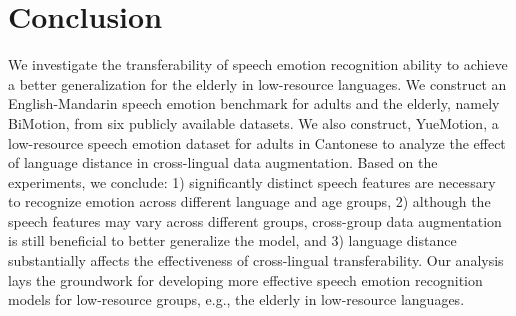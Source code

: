 \documentclass{INTERSPEECH2023}
\begin{document}
\section{Conclusion}

We investigate the transferability of speech emotion recognition ability to achieve a better generalization for the elderly in low-resource languages. We construct an English-Mandarin speech emotion benchmark for adults and the elderly, namely BiMotion, from six publicly available datasets. We also construct, YueMotion, a low-resource speech emotion dataset for adults in Cantonese to analyze the effect of language distance in cross-lingual data augmentation. Based on the experiments, we conclude: 1) significantly distinct speech features are necessary to recognize emotion across different language and age groups, 2) although the speech features may vary across different groups, cross-group data augmentation is still beneficial to better generalize the model, and 3) language distance substantially affects the effectiveness of cross-lingual transferability.
Our analysis lays the groundwork for developing more effective speech emotion recognition models for low-resource groups, e.g., the elderly in low-resource languages.






\end{document}
